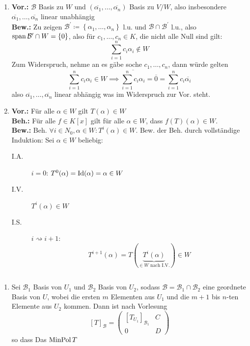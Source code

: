\documentclass[sectionformat = aufgabe]{gadsescript}
\begin{document}
\subsection{}
\begin{enumerate}[label=(\alph*)]
	\item 
		\textbf{Vor.:} $ \mathcal{B}  $ Basis zu $ W $ und $ \left( \overline{\alpha_1} , \dotsc, \overline{\alpha_n}  \right)   $ Basis zu $ V / W $, also insbesondere $ \overline{\alpha_1} , \dotsc, \overline{\alpha_n}  $ linear unabhängig\\
		\textbf{Bew.:}
		Zu zeigen $ \mathcal{B} ^\prime \coloneqq \left\{ \alpha_1, \dotsc, \alpha_n \right\}  $ l.u. und $ \mathcal{B} \cap \mathcal{B} ^\prime  $ l.u., also $ \operatorname{span} \mathcal{B} ^\prime \cap W = \left\{ 0 \right\}  $, also für $ c_1, \dotsc, c_n \in K $, die nicht alle Null sind gilt:
		\[
			\sum_{i=1}^{n} c_i \alpha_i \not\in W
		\]
		Zum Widerspruch, nehme an es gäbe soche $ c_1, \dotsc, c_n $, dann würde gelten
		\[
			\sum_{i=1}^{n} c_i \alpha_i \in W \implies \overline{\sum_{i=1}^{n} c_i \alpha_i} = \overline{0} = \sum_{i=1}^{n} c_i \overline{\alpha_i} 
		\]
		also $ \overline{\alpha_1}, \dotsc, \overline{\alpha_n}   $ linear abhängig was im Widerspruch zur Vor. steht.
	\item 
		\textbf{Vor.:} Für alle $ \alpha \in W $ gilt $ T(\alpha) \in W $\\
		\textbf{Beh.:} Für alle $ f \in K[x] $ gilt für alle $ \alpha \in W $, dass $ f(T)(\alpha) \in W $.\\
		\textbf{Bew.:} Beh. $ \forall i \in N_{0}, \alpha \in W  : T^{i} (\alpha) \in W  $.
		Bew. der Beh. durch vollständige Induktion:
		Sei $ \alpha \in W $ beliebig:
		\begin{description}
			\item[I.A.] $ i = 0 $: $ T^{0} (\alpha) = \operatorname{Id}(\alpha) = \alpha \in W $
			\item[I.V.] $ T^{i} (\alpha) \in W $ 
			\item[I.S.] $ i \rightsquigarrow i + 1 $:
				\[
					T^{i + 1} (\alpha) = T \left( \underbrace{T^{i} (\alpha)}_{\in W \text{ nach I.V.} } \right) \in W
				\]
		\end{description}
\end{enumerate}

\subsection{}
\begin{enumerate}[label=(\alph*)]
	\item Sei $ \mathcal{B}_1  $ Basis von $ U_1 $ und $ \mathcal{B} _2 $ Basis von $ U_2 $, sodass $ \mathcal{B} = \mathcal{B} _1 \cap \mathcal{B} _2 $ eine geordnete Basis von $ U $, wobei die ersten $ m $ Elementen aus $ U_1 $ und die $ m+1 $ bis $ n $-ten Elemente aus $ U_2 $ kommen.
		Dann ist nach Vorlesung
		\[
			[T]_{\mathcal{B} } = \begin{pmatrix} [T_{U_1} ]_{\mathcal{B} _1} & C \\ 0 & D  \end{pmatrix}
		\]
		so dass
		Das $ \operatorname{Min Pol} T $
\end{enumerate}
\end{document}
